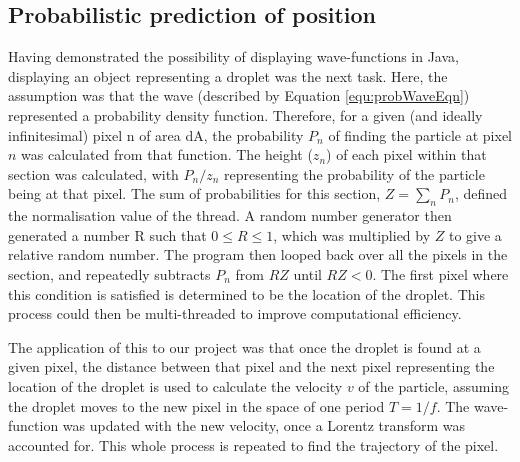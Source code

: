 \subsection{Probabilistic prediction of position}
Having demonstrated the possibility of displaying wave-functions in Java, displaying an object representing a droplet was the next task. Here, the assumption was that the wave (described by Equation \ref{equ:probWaveEqn}) represented a probability density function. Therefore, for a given (and ideally infinitesimal) pixel n of area dA, the probability $P_n$ of finding the particle at pixel $n$ was calculated from that function. The height ($z_n$) of each pixel within that section was calculated, with ${P_n}/{z_n}$ representing the probability of the particle being at that pixel. The sum of probabilities for this section, $Z=\sum_n{P_n}$, defined the normalisation value of the thread. A random number generator then generated a number R such that $0\leq R \leq 1$, which was multiplied by $Z$ to give a relative random number. The program then looped back over all the pixels in the section, and repeatedly subtracts $P_n$ from $RZ$ until $RZ<0$. The first pixel where this condition is satisfied is determined to be the location of the droplet. This process could then be multi-threaded to improve computational efficiency.

The application of this to our project was that once the droplet is found at a given pixel, the distance between that pixel and the next pixel representing the location of the droplet is used to calculate the velocity $v$ of the particle, assuming the droplet moves to the new pixel in the space of one period $T=1/f$. The wave-function was updated with the new velocity, once a Lorentz transform was accounted for. This whole process is repeated to find the trajectory of the pixel.

